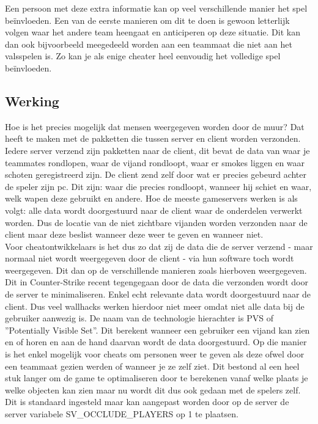 \documentclass[pdftex,a4paper,12pt,twoside]{report}
\begin{document}
Een persoon met deze extra informatie kan op veel verschillende manier het spel beïnvloeden. Een van de eerste manieren om dit te doen is gewoon letterlijk volgen waar het andere team heengaat en anticiperen op deze situatie. Dit kan dan ook bijvoorbeeld meegedeeld worden aan een teammaat die niet aan het valsspelen is. Zo kan je als enige \gls{cheat}er heel eenvoudig het volledige spel beïnvloeden.


\subsection{Werking}
\label{subsec:werking}
Hoe is het precies mogelijk dat mensen weergegeven worden door de muur? Dat heeft te maken met de pakketten die tussen server en client worden verzonden. Iedere server verzend zijn pakketten naar de client, dit bevat de data van waar je teammates rondlopen, waar de vijand rondloopt, waar er smokes liggen en waar schoten geregistreerd zijn. De client zend zelf door wat er precies gebeurd achter de speler zijn pc. Dit zijn: waar die precies rondloopt, wanneer hij schiet en waar, welk wapen deze gebruikt en andere. Hoe de meeste gameservers werken is als volgt: alle data wordt doorgestuurd naar de client waar de onderdelen verwerkt worden. Dus de locatie van de niet zichtbare vijanden worden verzonden naar de client maar deze beslist wanneer deze weer te geven en wanneer niet.
\\

Voor \gls{cheat}ontwikkelaars is het dus zo dat zij de data die de server verzend - maar normaal niet wordt weergegeven door de client - via hun software toch wordt weergegeven. Dit dan op de verschillende manieren zoals hierboven weergegeven.
\\

Dit in Counter-Strike recent tegengegaan door de data die verzonden wordt door de server te minimaliseren. Enkel echt relevante data wordt doorgestuurd naar de client. Dus veel wallhacks werken hierdoor niet meer omdat niet alle data bij de gebruiker aanwezig is. De naam van de technologie hierachter is PVS of ''Potentially Visible Set''. Dit berekent wanneer een gebruiker een vijand kan zien en of horen en aan de hand daarvan wordt de data doorgestuurd. Op die manier is het enkel mogelijk voor \gls{cheat}s om personen weer te geven als deze ofwel door een teammaat gezien werden of wanneer je ze zelf ziet. Dit bestond al een heel stuk langer om de game te optimaliseren door te berekenen vanaf welke plaats je welke objecten kan zien maar nu wordt dit dus ook gedaan met de spelers zelf. 
\citep{PVS}
Dit is standaard ingesteld maar kan aangepast worden door op de server de server variabele SV\_OCCLUDE\_PLAYERS op 1 te plaatsen.
\end{document}
